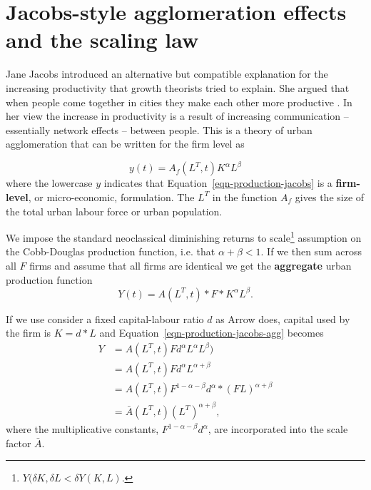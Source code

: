 \section{Jacobs-style agglomeration effects and the scaling law}
Jane Jacobs introduced an alternative but compatible explanation for the increasing productivity that growth theorists tried to explain. She argued that when people come together in cities they make each other more productive \cite{jacobsEconomyCities1969}. In her view the increase in productivity is a result of increasing communication -- essentially network effects -- between people.  This is a theory of urban agglomeration that can be written for the firm level as%

\begin{equation}
y(t) = A_f(L^T,t) K^\alpha L^\beta 
\label{eqn-production-jacobs}
\end{equation}
where the  lowercase $y$  indicates that Equation~\ref{eqn-production-jacobs} is a \textbf{firm-level}, or micro-economic, formulation. The $L^T$  in the function $A_f$ gives the size of the total urban labour force or urban population.

We impose the standard neoclassical diminishing returns to scale\footnote{$Y(\delta K,\delta L< \delta Y(K,L)$.} assumption on the \gls{Cobb-Douglas} production function, i.e. that 
$\alpha +\beta <1$.  
 If we then sum across all $F$ firms and assume that all firms are identical we get the \textbf{aggregate} urban production function
\begin{equation}
Y(t) = A(L^T, t)* F *K^\alpha L^\beta. 
\label{eqn-production-jacobs-agg}
\end{equation}

If we use consider a fixed capital-labour ratio $d$ as Arrow does,  capital used by the firm is  $K=d*L$ and Equation~\ref{eqn-production-jacobs-agg} becomes
\begin{align}
Y &= A(L^T, t) F d^\alpha L^\alpha L^\beta) \nonumber\\
&=A(L^T, t)F d^\alpha L^{\alpha +\beta} \nonumber\\
&= A(L^T, t) F^{1-\alpha -\beta}d^\alpha * (F L)^{\alpha +\beta} \nonumber \\
&=\bar A(L^T, t) (L^T)^{\alpha +\beta},  
 \label{eqn-production-jacobs-city-2}
\end{align} 
where the  multiplicative constants,  $F^{1-\alpha -\beta}d^\alpha$, are incorporated into the scale factor $\bar A$. 


